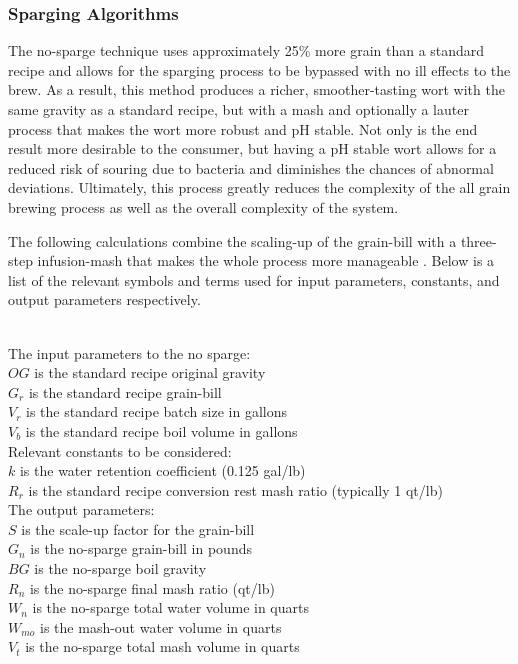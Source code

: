 \documentclass{article}
\begin{document}
\subsubsection{Sparging Algorithms}
The no-sparge technique uses approximately 25\% more grain than a standard recipe and allows for the sparging process to be bypassed with no ill effects to the brew.  As a result, this method produces a richer, smoother-tasting \gls{wort} with the same gravity as a standard recipe, but with a mash and optionally a \gls{lauter} process that makes the \gls{wort} more robust and pH stable.  Not only is the end result more desirable to the consumer, but having a pH stable \gls{wort} allows for a reduced risk of souring due to bacteria and diminishes the chances of abnormal deviations.  Ultimately, this process greatly reduces the complexity of the all grain brewing process as well as the overall complexity of the system.

The following calculations combine the scaling-up of the \gls{grain-bill} with a three-step infusion-mash that makes the whole process more manageable \cite{sparging}.  Below is a list of the relevant symbols and terms used for input parameters, constants, and output parameters respectively.

\noindent \\The input parameters to the no \gls{sparge}: \\
$OG$ is the standard recipe original \gls{gravity} \\
$G_{r}$ is the standard recipe \gls{grain-bill} \\
$V_{r}$ is the standard recipe batch size in gallons \\
$V_{b}$ is the standard recipe boil volume in gallons \\

\noindent Relevant constants to be considered: \\
$k$ is the water retention coefficient (0.125 gal/lb) \\
$R_{r}$ is the standard recipe conversion rest mash ratio (typically 1 qt/lb) \\

\noindent The output parameters: \\
$S$ is the scale-up factor for the \gls{grain-bill} \\
$G_{n}$ is the no-sparge \gls{grain-bill} in pounds \\
$BG$ is the no-sparge boil gravity \\
$R_{n}$ is the no-sparge final mash ratio (qt/lb) \\
$W_{n}$ is the no-sparge total water volume in quarts \\
$W_{mo}$ is the mash-out water volume in quarts \\
$V_{t}$ is the no-sparge total mash volume in quarts \\
\end{document}
